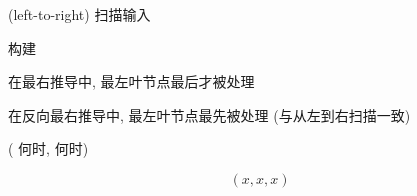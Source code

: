 \begin{frame}{}
  \begin{center}
    {\large {}}

    \vspace{0.80cm}
    \begin{description}
      \setlength{\itemsep}{15pt}
      \item[$L:$]  (left-to-right) 扫描输入
      \item[$R:$] 构建
    \end{description}

    在最右推导中, 最左叶节点最后才被处理

    \vspace{0.50cm}
    在反向最右推导中, 最左叶节点最先被处理 (与从左到右扫描一致)
  \end{center}
\end{frame}

\begin{frame}{}
      \vspace{0.20cm}
      ( 何时, 何时)
\end{frame}

\begin{frame}{}
  \begin{center}
    
    \[
      (x, x, x)
    \]
  \end{center}
\end{frame}

\begin{frame}{}
\end{frame}

\begin{frame}{}
\end{frame}

\begin{frame}{}
\end{frame}
